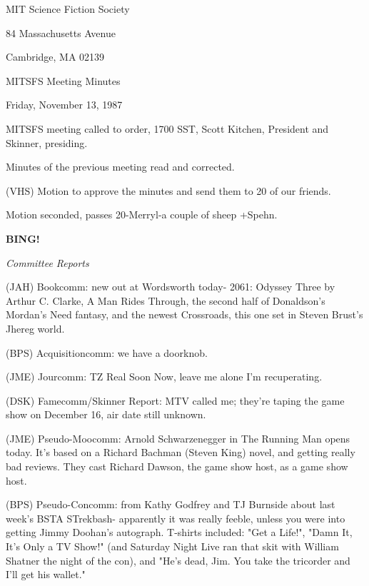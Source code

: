\documentclass[12pt]{article}
\newcommand{\bing}{{\bf BING!} }
\newcommand{\goto}[1]{\bing \vskip 12pt \centerline{{\em{#1}}}}
\begin{document}
\begin{center}

MIT Science Fiction Society 

84 Massachusetts Avenue

Cambridge, MA 02139

\vspace{12pt}

MITSFS Meeting Minutes 

Friday, November 13, 1987

\end{center}
 
\vspace{18pt}

\setlength{\parskip}{6pt}

\noindent
MITSFS meeting called to order, 1700 SST,
Scott Kitchen, President and Skinner, presiding.

Minutes of the previous meeting read and corrected.

(VHS) Motion to approve the minutes and send them to 20 of our friends.

Motion seconded, passes 20-Merryl-a couple of sheep +Spehn.

\goto{Committee Reports}

(JAH) Bookcomm: new out at Wordsworth today- 2061: Odyssey Three by Arthur C. Clarke, A Man Rides Through, the second half of Donaldson's Mordan's Need fantasy, and the newest Crossroads, this one set in Steven Brust's Jhereg world.

(BPS) Acquisitioncomm: we have a doorknob.

(JME) Jourcomm: TZ Real Soon Now, leave me alone I'm recuperating.

(DSK) Famecomm/Skinner Report: MTV called me; they're taping the game show on December 16, air date still unknown.

(JME) Pseudo-Moocomm: Arnold Schwarzenegger in The Running Man opens today. It's based on a Richard Bachman (Steven King) novel, and getting really bad reviews. They cast Richard Dawson, the game show host, as a game show host.

(BPS) Pseudo-Concomm: from Kathy Godfrey and TJ Burnside about last week's BSTA STrekbash- apparently it was really feeble, unless you were into getting Jimmy Doohan's autograph. T-shirts included: "Get a Life!", "Damn It, It's Only a TV Show!" (and Saturday Night Live ran that skit with William Shatner the night of the con), and "He's dead, Jim. You take the tricorder and I'll get his wallet."
\end{document}
